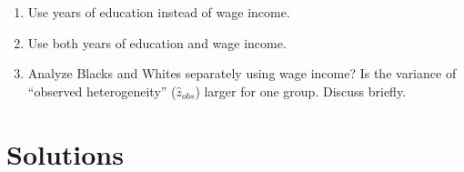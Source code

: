 \documentclass[]{book}
\providecommand{\tightlist}{%
  \setlength{\itemsep}{0pt}\setlength{\parskip}{0pt}}
\begin{document}
\begin{enumerate}
  \begin{enumerate}
  \def\labelenumii{\alph{enumii}.}
  \tightlist
  \item
    Use years of education instead of wage income.
  \item
    Use both years of education and wage income.
  \item
    Analyze Blacks and Whites separately using wage income? Is the variance of ``observed heterogeneity'' (\(\hat{z}_{obs}\)) larger for one group. Discuss briefly.
  \end{enumerate}
\end{enumerate}

\hypertarget{solutions-2}{%
\section{Solutions}\label{solutions-2}}
\end{document}
